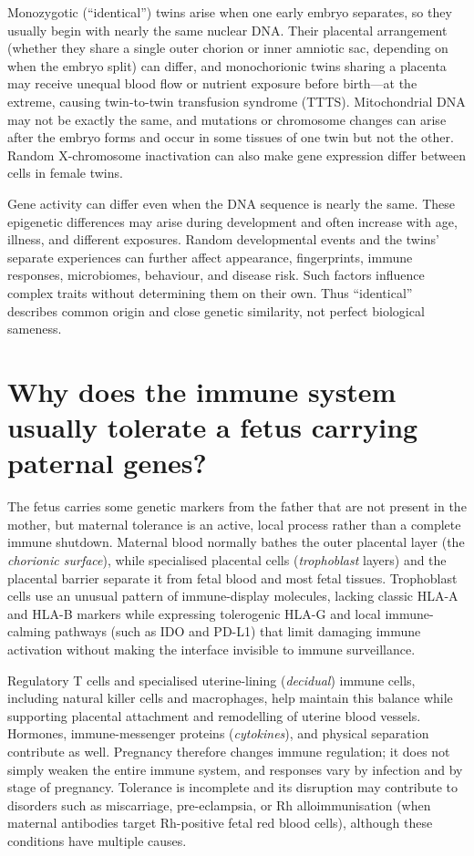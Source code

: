 \documentclass[11pt,oneside]{report}
\begin{document}
Monozygotic (``identical'') twins arise when one early embryo separates, so they
usually begin with nearly the same nuclear DNA. Their placental arrangement
(whether they share a single outer chorion or inner amniotic sac, depending on
when the embryo split) can differ, and monochorionic twins sharing a placenta
may receive unequal blood flow or nutrient exposure before birth—at the extreme,
causing twin-to-twin transfusion syndrome (TTTS). Mitochondrial DNA may not be exactly the same,
and mutations or chromosome changes can arise after the embryo forms and occur
in some tissues of one twin but not the other. Random X-chromosome
inactivation can also make gene expression differ between cells in female
twins.

Gene activity can differ even when the DNA sequence is nearly the same. These
epigenetic differences may arise during development and often increase with
age, illness, and different exposures. Random developmental events and the
twins' separate experiences can further affect appearance, fingerprints,
immune responses, microbiomes, behaviour, and disease risk. Such factors
influence complex traits without determining them on their own. Thus
``identical'' describes common origin and close genetic similarity, not perfect
biological sameness.

\section{Why does the immune system usually tolerate a fetus carrying paternal genes?}

The fetus carries some genetic markers from the father that are not present in
the mother, but maternal tolerance is an active, local process rather than a
complete immune shutdown. Maternal blood normally bathes the outer placental layer (the \emph{chorionic
surface}), while specialised placental cells (\emph{trophoblast} layers) and the
placental barrier separate it from fetal blood and most fetal tissues.
Trophoblast cells use an unusual pattern of immune-display molecules, lacking
classic HLA-A and HLA-B markers while expressing tolerogenic HLA-G and local
immune-calming pathways (such as IDO and PD-L1) that limit damaging immune
activation without making the interface invisible to immune surveillance.

Regulatory T cells and specialised uterine-lining (\emph{decidual}) immune
cells, including natural killer cells and macrophages, help maintain this
balance while supporting placental attachment and remodelling of uterine blood
vessels. Hormones, immune-messenger proteins (\emph{cytokines}), and physical
separation contribute as well. Pregnancy therefore changes immune regulation; it
does not simply weaken the entire immune system, and responses vary by
infection and by stage of pregnancy. Tolerance is incomplete and its disruption
may contribute to disorders such as miscarriage, pre-eclampsia, or Rh
alloimmunisation (when maternal antibodies target Rh-positive fetal red blood
cells), although these conditions have multiple causes.
\end{document}
